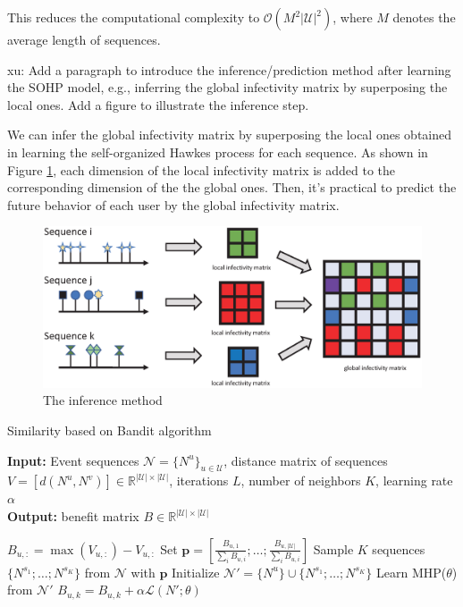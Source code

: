 \documentclass[runningheads]{llncs}
\newcommand{\xu}[1]{{\color{red} xu: #1}}
\begin{document}
This reduces the computational complexity to $\mathcal{O}(M^2 |\mathcal{U}|^2)$, where $M$ denotes the average length of sequences.

\xu{Add a paragraph to introduce the inference/prediction method after learning the SOHP model, e.g., inferring the global infectivity matrix by superposing the local ones. Add a figure to illustrate the inference step.}

We can infer the global infectivity matrix by superposing the local ones obtained in learning the self-organized Hawkes process for each sequence. As shown in Figure \ref{fig3}, each dimension of the local infectivity matrix is added to the corresponding dimension of the  the global ones. Then, it's practical to predict the future behavior of each user by the global infectivity matrix.

\begin{figure}[htbp]
\centerline{\includegraphics[scale=0.5]{figure3.eps}}
\caption{The inference method}
\label{fig3}
\end{figure}

\begin{algorithm}[t]
\caption{Similarity based on Bandit algorithm} 
\hspace*{0.02in} {\bf Input:}
Event sequences $\mathcal{N}=\{N^u\}_{u \in \mathcal{U}}$, distance matrix of sequences $V=[d(N^u, N^v)] \in \mathbb{R}^{|\mathcal{U}| \times |\mathcal{U}|}$, iterations $L$, number of neighbors $K$, learning rate $\alpha$ \\
\hspace*{0.02in} {\bf Output:} 
benefit matrix $B \in \mathbb{R}^{|\mathcal{U}| \times |\mathcal{U}|}$
\begin{algorithmic}[1]
    \State $B_{u,:} = \max (V_{u,:}) - V_{u,:}$
        \State Set $\bm{p}=[\frac{B_{u,1}}{\sum_i B_{u,i}};\ldots;\frac{B_{u,|\mathcal{U}|}}{\sum_i B_{u,i}} ]$
        \State Sample $K$ sequences $\{N^{s_1};\ldots;N^{s_K}\}$ from $\mathcal{N}$ with $\bm{p}$
        \State Initialize $\mathcal{N}' = \{N^u\} \cup \{N^{s_1};\ldots;N^{s_K}\}$
        \State Learn MHP($\theta$) from $ \mathcal{N}' $
        \State $B_{u,k} = B_{u,k} + \alpha \mathcal{L}(N';\theta)$
        \EndFor
    \EndFor
\EndFor
\end{algorithmic}
\end{algorithm}
\end{document}
